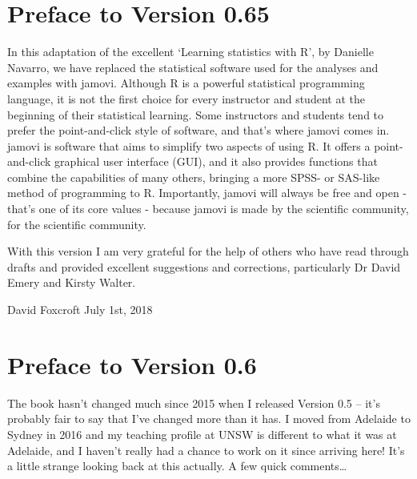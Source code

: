 \documentclass[
]{book}
\begin{document}
\hypertarget{preface-to-version-0.65}{%
\section{Preface to Version 0.65}\label{preface-to-version-0.65}}

In this adaptation of the excellent `Learning statistics with R', by Danielle Navarro, we have replaced the statistical software used for the analyses and examples with jamovi. Although R is a powerful statistical programming language, it is not the first choice for every instructor and student at the beginning of their statistical learning. Some instructors and students tend to prefer the point-and-click style of software, and that's where jamovi comes in. jamovi is software that aims to simplify two aspects of using R. It offers a point-and-click graphical user interface (GUI), and it also provides functions that combine the capabilities of many others, bringing a more SPSS- or SAS-like method of programming to R. Importantly, jamovi will always be free and open - that's one of its core values - because jamovi is made by the scientific community, for the scientific community.

With this version I am very grateful for the help of others who have read through drafts and provided excellent suggestions and corrections, particularly Dr David Emery and Kirsty Walter.

David Foxcroft
July 1st, 2018

\hypertarget{preface-to-version-0.6}{%
\section{Preface to Version 0.6}\label{preface-to-version-0.6}}

The book hasn't changed much since 2015 when I released Version 0.5 -- it's probably fair to say that I've changed more than it has. I moved from Adelaide to Sydney in 2016 and my teaching profile at UNSW is different to what it was at Adelaide, and I haven't really had a chance to work on it since arriving here! It's a little strange looking back at this actually. A few quick comments\ldots{}
\end{document}
